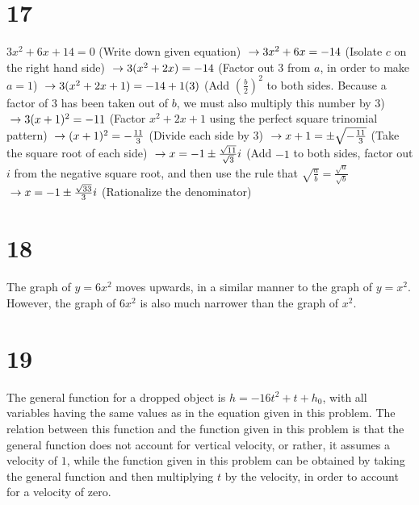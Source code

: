 \documentclass{article}
\theoremstyle{definition}
\begin{document}
\section*{17}
$3x^2+6x+14=0$ (Write down given equation)
$\newline\rightarrow 3x^2+6x=-14$ (Isolate $c$ on the right hand side)
$\newline\rightarrow 3(x^2+2x)=-14$ (Factor out $3$ from $a$, in order to make $a=1$)
$\newline\rightarrow 3(x^2+2x+1)=-14+1(3)$ (Add $(\frac{b}{2})^2$ to both sides. Because a factor of $3$ has been taken out of $b$, we must also multiply 
this number by $3$)
$\newline\rightarrow 3(x+1)^2=-11$ (Factor $x^2+2x+1$ using the perfect square trinomial pattern)
$\newline\rightarrow (x+1)^2=-\frac{11}{3}$ (Divide each side by $3$)
$\newline\rightarrow x+1=\pm\sqrt{-\frac{11}{3}}$ (Take the square root of each side) 
$\newline\rightarrow x=-1\pm\frac{\sqrt{11}}{\sqrt{3}}i$ (Add $-1$ to both sides, factor out $i$ from the negative square root, and then use the rule that 
$\sqrt{\frac{a}{b}}=\frac{\sqrt{a}}{\sqrt{b}}$
$\newline\rightarrow x=-1\pm\frac{\sqrt{33}}{3}i$ (Rationalize the denominator)

\section*{18}
The graph of $y=6x^2$ moves upwards, in a similar manner to the graph of $y=x^2$. However, the graph of $6x^2$ is also much narrower than the graph of 
$x^2$.

\section*{19}
The general function for a dropped object is $h=-16t^2+t+h_0$, with all variables having the same values as in the equation given in this problem. 
The relation between this 
function and the function given in this problem is that the general function does not account for vertical velocity, or rather, it assumes a velocity
of $1$, while the function given in this problem can be obtained by taking the general function and then multiplying $t$ by the velocity, in order to 
account for a velocity of zero.
\end{document}
